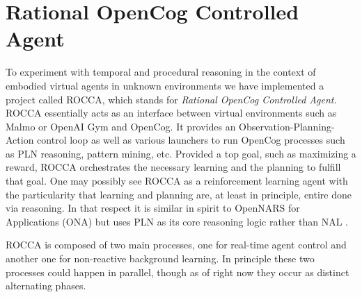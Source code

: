 \documentclass[runningheads]{llncs}
\begin{document}
\section{Rational OpenCog Controlled Agent}
To experiment with temporal and procedural reasoning in the context of
embodied virtual agents in unknown environments we have implemented a
project called ROCCA, which stands for \emph{Rational OpenCog
Controlled Agent}.  ROCCA essentially acts as an interface between
virtual environments such as Malmo \cite{TODO} or OpenAI Gym
\cite{TODO} and OpenCog.  It provides an Observation-Planning-Action
control loop as well as various launchers to run OpenCog processes
such as PLN reasoning, pattern mining, etc.
Provided a top goal, such as maximizing a reward, ROCCA orchestrates
the necessary learning and the planning to fulfill that goal.
One may possibly see ROCCA as a reinforcement learning agent with the
particularity that learning and planning are, at least in principle,
entire done via reasoning.  In that respect it is similar in spirit to
OpenNARS for Applications (ONA) \cite{TODO} but uses PLN as its core
reasoning logic rather than NAL \cite{TODO}.

ROCCA is composed of two main processes, one for real-time agent
control and another one for non-reactive background learning.  In
principle these two processes could happen in parallel, though as of
right now they occur as distinct alternating phases.
\end{document}
